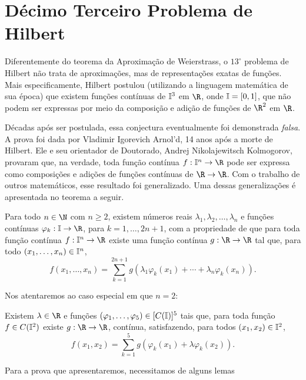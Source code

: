 \section{Décimo Terceiro Problema de Hilbert}

Diferentemente do teorema da Aproximação de Weierstrass, o \( 13^{ \circ } \) problema de Hilbert não trata de aproximações, mas de representações exatas de funções.
Mais especificamente, Hilbert postulou (utilizando a linguagem matemática de sua época) que existem funções contínuas de \( \mathbb{I}^{ 3 } \) em \( \R \), onde \( \mathbb{I} = [0, 1] \), que não podem ser expressas por meio da composição e adição de funções de \( \R^{ 2 } \) em \( \R \).

Décadas após ser postulada, essa conjectura eventualmente foi demonstrada \emph{falsa}.
A prova foi dada por Vladimir Igorevich Arnol'd, 14 anos após a morte de Hilbert.
Ele e seu orientador de Doutorado, Andrej Nikolajewitsch Kolmogorov, provaram que, na verdade, toda função contínua \( f : \I^{ n } \to \R \) pode ser expressa como composições e adições de funções contínuas de \( \R \to \R \).
Com o trabalho de outros matemáticos, esse resultado foi generalizado.
Uma dessas generalizações é apresentada no teorema a seguir.
\begin{teo}
    Para todo \( n \in \N \) com \( n \geq 2 \), existem números reais \( \lambda_{ 1 }, \lambda_{ 2 }, \dots, \lambda_{ n } \) e funções contínuas \( \varphi_{ k } : \I \to \R \), para \( k = 1, \dots, 2n + 1 \), com a propriedade de que para toda função contínua \( f : \I^{ n } \to \R \) existe uma função contínua \( g : \R \to \R \) tal que, para todo \( ( x_{ 1 }, \dots, x_{ n } ) \in \mathbb{I}^{ n } \),
    \begin{equation}
        f(x_{ 1 }, \dots, x_{ n }) =
        \sum_{ k=1 }^{ 2n+1 } g ( \lambda_{ 1 } \varphi_{ k } ( x_{ 1 } )  + \cdots + \lambda_{ n } \varphi_{ k } ( x_{ n } ) )
        \label{eq: kolmogorov_2}
    .\end{equation}
\end{teo}

Nos atentaremos ao caso especial em que \( n = 2 \):

\begin{teo}
    Existem \( \lambda \in \R \) e funções \( ( \varphi_{ 1 }, \dots, \varphi_{ 5 } ) \in [C(\mathbb{I})]^{ 5 } \) tais que, para toda função \( f \in C(\mathbb{I}^{ 2 }) \) existe \( g : \R \to \R \), contínua, satisfazendo, para todos \( ( x_{ 1 }, x_{ 2 } ) \in \mathbb{I}^{ 2 } \), \[
        f ( x_{ 1 }, x_{ 2 } ) =
        \sum_{ k=1 }^{ 5 } g ( \varphi_{ k } ( x_{ 1 } ) + \lambda \varphi_{ k } ( x_{ 2 } ) )
    .\]
\end{teo}

Para a prova que apresentaremos, necessitamos de alguns lemas
 